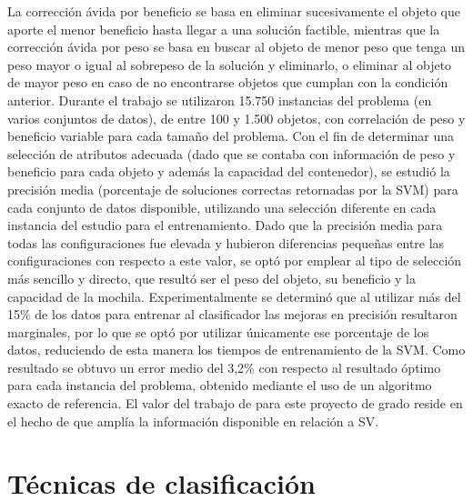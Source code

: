 La corrección ávida por beneficio se basa en eliminar sucesivamente el objeto que aporte el menor beneficio hasta llegar a una solución factible, mientras que la corrección ávida por peso se basa en buscar al objeto de menor peso que tenga un peso mayor o igual al sobrepeso de la solución y eliminarlo, o eliminar al objeto de mayor peso en caso de no encontrarse objetos que cumplan con la condición anterior.
Durante el trabajo se utilizaron 15.750 instancias del problema (en varios conjuntos de datos), de entre 100 y 1.500 objetos, con correlación de peso y beneficio variable para cada tamaño del problema.
Con el fin de determinar una selección de atributos adecuada (dado que se contaba con información de peso y beneficio para cada objeto y además la capacidad del contenedor), se estudió la precisión media (porcentaje de soluciones correctas retornadas por la SVM) para cada conjunto de datos disponible, utilizando una selección diferente en cada instancia del estudio para el entrenamiento.
Dado que la precisión media para todas las configuraciones fue elevada y hubieron diferencias pequeñas entre las configuraciones con respecto a este valor, se optó por emplear al tipo de selección más sencillo y directo, que resultó ser el peso del objeto, su beneficio y la capacidad de la mochila.
Experimentalmente se determinó que al utilizar más del 15\% de los datos para entrenar al clasificador las mejoras en precisión resultaron marginales, por lo que se optó por utilizar únicamente ese porcentaje de los datos, reduciendo de esta manera los tiempos de entrenamiento de la SVM.
Como resultado se obtuvo un error medio del 3,2\% con respecto al resultado óptimo para cada instancia del problema, obtenido mediante el uso de un algoritmo exacto de referencia.
El valor del trabajo de \citet{savant-bag} para este proyecto de grado reside en el hecho de que amplía la información disponible en relación a SV.

\section{Técnicas de clasificación} \label{section-trabajos-tecnicas-clasificacion}

